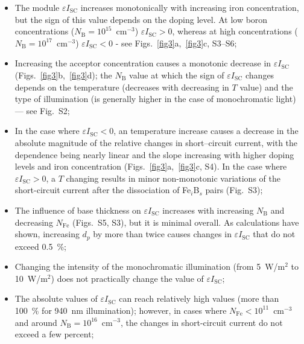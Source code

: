 \documentclass[a4paper,fleqn]{cas-sc}
\begin{document}
\begin{itemize}
    \item The module $\varepsilon I_\mathrm{SC}$ increases monotonically with increasing iron concentration, 
    but the sign of this value depends on the doping level. 
    At low boron concentrations ($N_\mathrm{B}=10^{15}$~cm$^{-3}$) $\varepsilon I_\mathrm{SC} > 0$, 
    whereas at high concentrations ($N_\mathrm{B}=10^{17}$~cm$^{-3}$) $\varepsilon I_\mathrm{SC} < 0$ - see Figs.~\ref{fig3}a,~\ref{fig3}c, S3--S6;
    \item Increasing the acceptor concentration causes a monotonic decrease in $\varepsilon I_\mathrm{SC}$ (Figs.~\ref{fig3}b,~\ref{fig3}d); 
    the $N_\mathrm{B}$ value at which the sign of $\varepsilon I_\mathrm{SC}$ changes depends on the temperature 
    (decreases with decreasing in $T$ value) and the type of illumination (is generally higher in the case of monochromatic light) --- see Fig.~S2;
    \item In the case where $\varepsilon I_\mathrm{SC} < 0$, an temperature increase causes a decrease in the absolute magnitude 
    of the relative changes in short--circuit current, with the dependence being nearly linear and 
    the slope increasing with higher doping levels and iron concentration (Figs.~\ref{fig3}a,~\ref{fig3}c, S4). 
    In the case where $\varepsilon I_\mathrm{SC} > 0$,
    a $T$ changing results in minor non-monotonic variations of the short-circuit current after the dissociation of Fe$_i$B$_s$  pairs (Fig.~S3); 
    \item The influence of base thickness on $\varepsilon I_\mathrm{SC}$ increases with 
    increasing $N_\mathrm{B}$ and decreasing $N_\mathrm{Fe}$ (Figs.~S5, S3), but it is minimal overall. 
    As calculations have shown, increasing $d_p$ by more than twice causes changes in $\varepsilon I_\mathrm{SC}$ that do not exceed 0.5~\%;
    \item Changing the intensity of the monochromatic illumination (from 5~W/m$^{2}$ to 10~W/m$^{2}$) does not practically change the value of $\varepsilon I_\mathrm{SC}$;
    \item The absolute values of $\varepsilon I_\mathrm{SC}$ can reach relatively high values (more than 100~\% for 940~nm illumination); 
    however, in cases where $N_\mathrm{Fe}<10^{11}$~cm$^{-3}$ and around $N_\mathrm{B}=10^{16}$~cm$^{-3}$, the changes in short-circuit current do not exceed a few percent;
\end{itemize}
\end{document}
